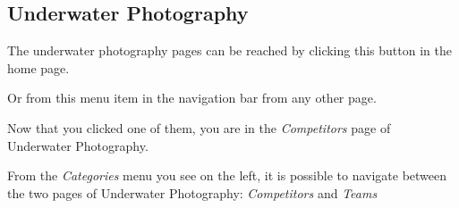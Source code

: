 \documentclass[a4paper,10pt,english]{sphinxmanual}
\begin{document}
\subsection{Underwater Photography}
\label{user/member4:underwater-photography}
The underwater photography pages can be reached by clicking this button in the home page.
\begin{quote}

\end{quote}

Or from this menu item in the navigation bar from any other page.
\begin{quote}

\end{quote}

Now that you clicked one of them, you are in the \emph{Competitors} page of Underwater Photography.
\begin{quote}

\end{quote}

From the \emph{Categories} menu you see on the left, it is possible to navigate between the two pages of Underwater Photography: \emph{Competitors} and \emph{Teams}
\end{document}

